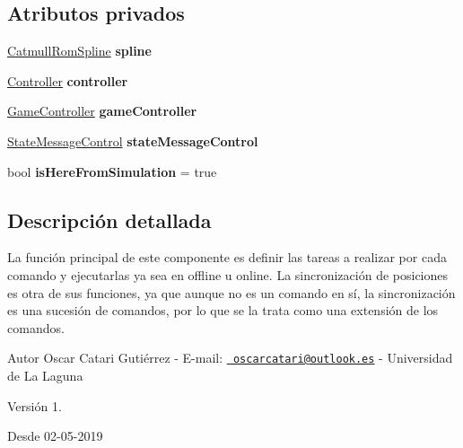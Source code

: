 \subsection*{Atributos privados}
\begin{DoxyCompactItemize}
\item 
\mbox{\label{class_command_control_ab72421d3afbbddc7a15ba11aa15e85d8}} 
\mbox{\hyperlink{class_catmull_rom_spline}{Catmull\+Rom\+Spline}} {\bfseries spline}
\item 
\mbox{\label{class_command_control_a38700e69a9a434ca92bb4cbf1aef5545}} 
\mbox{\hyperlink{class_controller}{Controller}} {\bfseries controller}
\item 
\mbox{\label{class_command_control_abb4378198632f261d94a4b6445de3a7b}} 
\mbox{\hyperlink{class_game_controller}{Game\+Controller}} {\bfseries game\+Controller}
\item 
\mbox{\label{class_command_control_a1eef363ceb2574b4e0df8d8d21c02b5a}} 
\mbox{\hyperlink{class_state_message_control}{State\+Message\+Control}} {\bfseries state\+Message\+Control}
\item 
\mbox{\label{class_command_control_a66c19bcb9897bf2f13b5f952d3729a90}} 
bool {\bfseries is\+Here\+From\+Simulation} = true
\end{DoxyCompactItemize}


\subsection{Descripción detallada}
La función principal de este componente es definir las tareas a realizar por cada comando y ejecutarlas ya sea en offline u online. La sincronización de posiciones es otra de sus funciones, ya que aunque no es un comando en sí, la sincronización es una sucesión de comandos, por lo que se la trata como una extensión de los comandos. \begin{DoxyAuthor}{Autor}
Oscar Catari Gutiérrez -\/ E-\/mail\+: \href{mailto:oscarcatari@outlook.es}{\texttt{ oscarcatari@outlook.\+es}} -\/ Universidad de La Laguna 
\end{DoxyAuthor}
\begin{DoxyVersion}{Versión}
1. 
\end{DoxyVersion}
\begin{DoxySince}{Desde}
02-\/05-\/2019 
\end{DoxySince}


